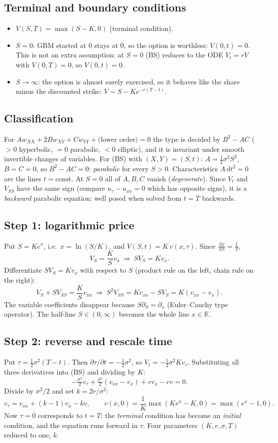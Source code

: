 \documentclass[11pt]{article}
\newcommand{\dd}{\,\mathrm d}
\newcommand{\R}{\mathbb R}
\theoremstyle{definition}
\begin{document}
\subsection{Terminal and boundary conditions}
\begin{itemize}[nosep]
  \item $V(S,T)=\max(S-K,0)$ (terminal condition).
  \item $S=0$: GBM started at $0$ stays at $0$, so the option is worthless: $V(0,t)=0$. This is not an extra
    assumption: at $S=0$ (BS) reduces to the ODE $V_t=rV$ with $V(0,T)=0$, so $V(0,t)=0$.
  \item $S\to\infty$: the option is almost surely exercised, so it behaves like the share minus the discounted
    strike: $V\sim S-Ke^{-r(T-t)}$.
\end{itemize}

\subsection{Classification}
For $A w_{XX}+2Bw_{XY}+Cw_{YY}+\text{(lower order)}=0$ the type is decided by $B^2-AC$
($>0$ hyperbolic, $=0$ parabolic, $<0$ elliptic), and it is invariant under smooth invertible changes of
variables. For (BS) with $(X,Y)=(S,t)$: $A=\tfrac12\sigma^2S^2$, $B=C=0$, so $B^2-AC=0$:
\emph{parabolic} for every $S>0$. Characteristics $A\dd t^2=0$ are the lines $t=\text{const}$.
At $S=0$ all of $A,B,C$ vanish (\emph{degenerate}). Since $V_t$ and $V_{SS}$ have the same sign
(compare $u_\tau-u_{xx}=0$ which has opposite signs), it is a \emph{backward} parabolic equation: well posed
when solved from $t=T$ backwards.

\subsection{Step 1: logarithmic price}
Put $S=Ke^x$, i.e.\ $x=\ln(S/K)$, and $V(S,t)=K\,v(x,\tau)$. Since $\frac{\dd x}{\dd S}=\frac1S$,
\[
  V_S=\frac{K}{S}v_x\ \Rightarrow\ SV_S=Kv_x .
\]
Differentiate $SV_S=Kv_x$ with respect to $S$ (product rule on the left, chain rule on the right):
\[
  V_S+SV_{SS}=\frac{K}{S}v_{xx}\ \Rightarrow\ S^2V_{SS}=Kv_{xx}-SV_S=K(v_{xx}-v_x).
\]
The variable coefficients disappear because $S\partial_S=\partial_x$ (Euler--Cauchy type operator).
The half-line $S\in(0,\infty)$ becomes the whole line $x\in\R$.

\subsection{Step 2: reverse and rescale time}
Put $\tau=\tfrac12\sigma^2(T-t)$. Then $\partial\tau/\partial t=-\tfrac12\sigma^2$, so $V_t=-\tfrac12\sigma^2Kv_\tau$.
Substituting all three derivatives into (BS) and dividing by $K$:
\[
  -\tfrac{\sigma^2}{2}v_\tau+\tfrac{\sigma^2}{2}(v_{xx}-v_x)+rv_x-rv=0 .
\]
Divide by $\sigma^2/2$ and set $k=2r/\sigma^2$:
\[
  v_\tau=v_{xx}+(k-1)v_x-kv,\qquad v(x,0)=\frac{1}{K}\max(Ke^x-K,0)=\max(e^x-1,0).
\]
Now $\tau=0$ corresponds to $t=T$: the \emph{terminal} condition has become an \emph{initial} condition, and
the equation runs forward in $\tau$. Four parameters $(K,r,\sigma,T)$ reduced to one, $k$.
\end{document}
